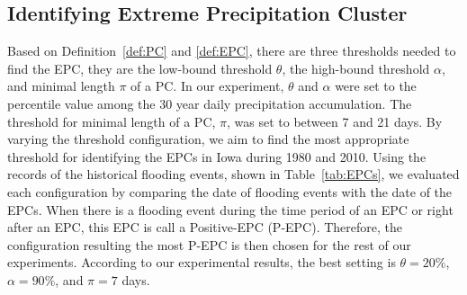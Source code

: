 \documentclass{acm_proc_article-sp}
\begin{document}
\subsection{Identifying Extreme Precipitation Cluster}
Based on Definition~\ref{def:PC} and \ref{def:EPC}, there are three thresholds needed to find the EPC, they are the low-bound threshold $\theta$, the high-bound threshold $\alpha$, and minimal length $\pi$ of a PC. In our experiment, $\theta$ and $\alpha$ were set to the percentile value among the 30 year daily precipitation accumulation. The threshold for
minimal length of a PC, $\pi$, was set to between 7 and 21 days. By varying the threshold configuration, we aim to find the most appropriate threshold for identifying the EPCs in Iowa during 1980 and 2010. Using the records of the historical flooding events, shown in Table~\ref{tab:EPCs}, we evaluated each configuration by comparing the date of flooding events with the date of the EPCs. When there is a flooding event during the time period of an EPC or right after an EPC, this EPC is call a Positive-EPC (P-EPC). Therefore, the configuration resulting the most P-EPC is then chosen for the rest of our experiments. According to our experimental results, the best setting is $\theta = 20\% $, $\alpha = 90\% $, and $\pi = 7$ days.   
\end{document}
